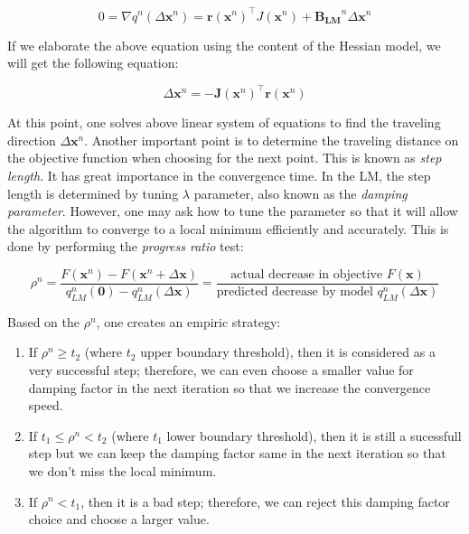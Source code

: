 \documentclass[a4paper]{report}
\numberwithin{figure}{section}
\begin{document}
\begin{appendices}
\begin{equation}\label{eq:lm_descent_direction}
  0 = 
  \nabla q^{n}(\Delta \mathbf{x}^n) = 
  \mathbf{r}(\mathbf{x}^n)^\top J(\mathbf{x}^n) + 
  \mathbf{B_{LM}}^n\Delta \mathbf{x}^n
\end{equation}


If we elaborate the above equation using the content of the Hessian model, 
we will get the following equation: 

\begin{equation}
  [\mathbf{J}(\mathbf{x}^n)^\top\mathbf{J}(\mathbf{x}^n) + 
  \lambda^n\mathbf{I}]\Delta \mathbf{x}^n = 
  -\mathbf{J}(\mathbf{x}^n)^\top\mathbf{r}(\mathbf{x}^n)
\end{equation}\label{eq:damping_full}

At this point, one solves above linear system of equations to find the traveling direction 
$\Delta \mathbf{x}^n$. Another important point is to determine the traveling 
distance on the objective function when choosing for the next point. This 
is known as \textit{step length}. It has great importance in the 
convergence time. 
In the LM, the step length is determined by tuning $\lambda$ parameter, also 
known as the 
\textit{damping parameter}. However, one may ask 
how to tune the parameter 
so that it will allow the algorithm to converge to a local minimum efficiently 
and accurately. This is done by performing the \textit{progress ratio} test:

\begin{equation}\label{eq:lm_progress_ratio}
  \rho^n = \frac{F(\mathbf{x}^n) - F(\mathbf{x}^n+\Delta \mathbf{x})}{q_{LM}^n(\mathbf{0})-q_{LM}^n(\Delta \mathbf{x})} =
  \frac{\text{actual decrease in objective } F(\mathbf{x})}
  {\text{predicted decrease by model } q_{LM}^n(\Delta \mathbf{\mathbf{x}})}
\end{equation}

Based on the $\rho^n$, one creates an empiric strategy:

\begin{enumerate}
  \item If $\rho^n \geq t_2$ (where $t_2$ upper boundary threshold), then it is considered as a very successful step; 
    therefore, we can even choose a smaller value for damping factor in the 
    next iteration 
    so that 
    we increase the convergence speed.
  \item If $t_1 \leq \rho^n < t_2$ (where $t_1$ lower boundary threshold), 
  then it is still a sucessfull step but we 
    can keep the damping factor same in the next iteration so that we don't 
    miss the local minimum.
  \item If $\rho^n < t_1$, then it is a bad step; therefore, we can reject this 
    damping factor choice and choose a larger value.
\end{enumerate}


\end{appendices}
\end{document}
